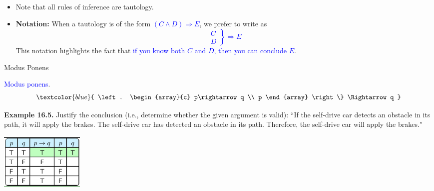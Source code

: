 \documentclass[aspectratio=169]{beamer}
\providecommand{\Blue}[1]{\textcolor{blue}{#1}}
\begin{document}
\begin{frame}[plain]{ }
  
  \begin{itemize}
   \item Note that all rules of inference are tautology.
   \item {\bf Notation:} When a tautology is of the form \Blue{$(C\wedge D)\Rightarrow E$}, we prefer to write as
       \Blue{
       \[ \left. \begin{array}{c}
            C \\ D
           \end{array} \right\}  \Rightarrow E
       \]
       }
      This notation highlights the fact that \Blue{if you know both $C$ and $D$, then 
      you can conclude $E$}.


  \end{itemize}
 
   \vspace{1in}
   
\end{frame}

\begin{frame}[plain]{Modus Ponens}
  
 \Blue{Modus ponens}.
      \[ \Blue{ \left. \begin{array}{c}
             p\rightarrow q \\ p 
           \end{array} \right\}  \Rightarrow q
           }
       \]
      \medskip
      
 
   {\bf Example 16.5.} Justify the conclusion (i.e., determine whether the given argument is valid): 
 ``If the self-drive car detects an obstacle in its path, 
 it will apply the brakes. The self-drive car has detected an obstacle 
 in its path. Therefore, the self-drive car will apply the brakes."
    \pause 
    \medskip
    
     \begin{center}
       \includegraphics[height=2.7cm]{./img/lecture16-fig5.png}
     \end{center}
  

\end{frame}
\end{document}
